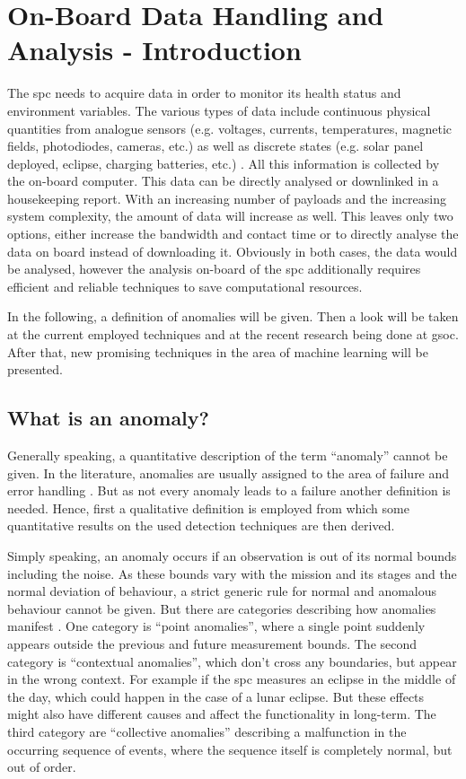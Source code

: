 \chapter{On-Board Data Handling and Analysis - Introduction}
The \ac{spc} needs to acquire data in order to monitor its health status and environment variables. The various types of data include continuous physical quantities from analogue sensors (e.g. voltages, currents, temperatures, magnetic fields, photodiodes, cameras, etc.) as well as discrete states (e.g. solar panel deployed, eclipse, charging batteries, etc.) \cite[p. 484-485]{stbook}. All this information is collected by the on-board computer. This data can be directly analysed or downlinked in a housekeeping report. With an increasing number of payloads and the increasing system complexity, the amount of data will increase as well. This leaves only two options, either increase the bandwidth and contact time or to directly analyse the data on board instead of downloading it. Obviously in both cases, the data would be analysed, however the analysis on-board of the \ac{spc} additionally requires efficient and reliable techniques to save computational resources.

In the following, a definition of anomalies will be given. Then a look will be taken at the current employed techniques and at the recent research being done at \ac{gsoc}. 
After that, new promising techniques in the area of machine learning will be presented.

\section{What is an anomaly?}
\label{c:anomaly_definition}
Generally speaking, a quantitative description of the term \enquote{anomaly} cannot be given. In the literature, anomalies are usually assigned to the area of failure and error handling \cite[p. 470f]{stbook}. But as not every anomaly leads to a failure another definition is needed. Hence, first a qualitative definition is employed from which some quantitative results on the used detection techniques are then derived.

Simply speaking, an anomaly occurs if an observation is out of its normal bounds including the noise. As these bounds vary with the mission and its stages and the normal deviation of behaviour, a strict generic rule for normal and anomalous behaviour cannot be given. \newline
But there are categories describing how anomalies manifest \cite[p 7f]{anomaly-survey}. One category is \enquote{point anomalies}, where a single point suddenly appears outside the previous and future measurement bounds. The second category is \enquote{contextual anomalies}, which don't cross any boundaries, but appear in the wrong context. For example if the \ac{spc} measures an eclipse in the middle of the day, which could happen in the case of a lunar eclipse. But these effects might also have different causes and affect the functionality in long-term. The third category are \enquote{collective anomalies} describing a malfunction in the occurring sequence of events, where the sequence itself is completely normal, but out of order.

